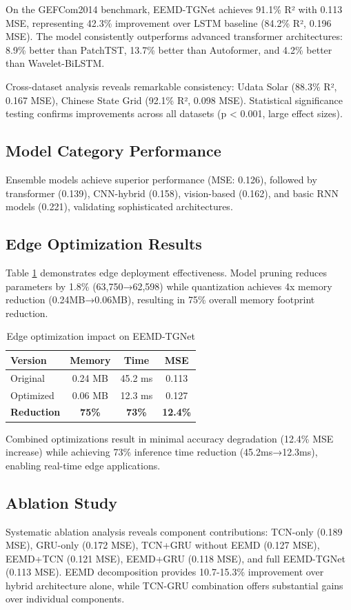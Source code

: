 \documentclass[conference]{IEEEtran}
\begin{document}
On the GEFCom2014 benchmark, EEMD-TGNet achieves 91.1\% R² with 0.113 MSE, representing 42.3\% improvement over LSTM baseline (84.2\% R², 0.196 MSE). The model consistently outperforms advanced transformer architectures: 8.9\% better than PatchTST, 13.7\% better than Autoformer, and 4.2\% better than Wavelet-BiLSTM.

Cross-dataset analysis reveals remarkable consistency: Udata Solar (88.3\% R², 0.167 MSE), Chinese State Grid (92.1\% R², 0.098 MSE). Statistical significance testing confirms improvements across all datasets (p < 0.001, large effect sizes).

\subsection{Model Category Performance}
Ensemble models achieve superior performance (MSE: 0.126), followed by transformer (0.139), CNN-hybrid (0.158), vision-based (0.162), and basic RNN models (0.221), validating sophisticated architectures.

\subsection{Edge Optimization Results}
Table \ref{tab:optimization} demonstrates edge deployment effectiveness. Model pruning reduces parameters by 1.8\% (63,750→62,598) while quantization achieves 4x memory reduction (0.24MB→0.06MB), resulting in 75\% overall memory footprint reduction.

\begin{table}[htbp]
\centering
\caption{Edge optimization impact on EEMD-TGNet}
\label{tab:optimization}
\begin{tabular}{@{}lccc@{}}
\toprule
\textbf{Version} & \textbf{Memory} & \textbf{Time} & \textbf{MSE} \\
\midrule
Original & 0.24 MB & 45.2 ms & 0.113 \\
Optimized & 0.06 MB & 12.3 ms & 0.127 \\
\textbf{Reduction} & \textbf{75\%} & \textbf{73\%} & \textbf{12.4\%} \\
\bottomrule
\end{tabular}
\end{table}

Combined optimizations result in minimal accuracy degradation (12.4\% MSE increase) while achieving 73\% inference time reduction (45.2ms→12.3ms), enabling real-time edge applications.

\subsection{Ablation Study}
Systematic ablation analysis reveals component contributions: TCN-only (0.189 MSE), GRU-only (0.172 MSE), TCN+GRU without EEMD (0.127 MSE), EEMD+TCN (0.121 MSE), EEMD+GRU (0.118 MSE), and full EEMD-TGNet (0.113 MSE). EEMD decomposition provides 10.7-15.3\% improvement over hybrid architecture alone, while TCN-GRU combination offers substantial gains over individual components.
\end{document}

